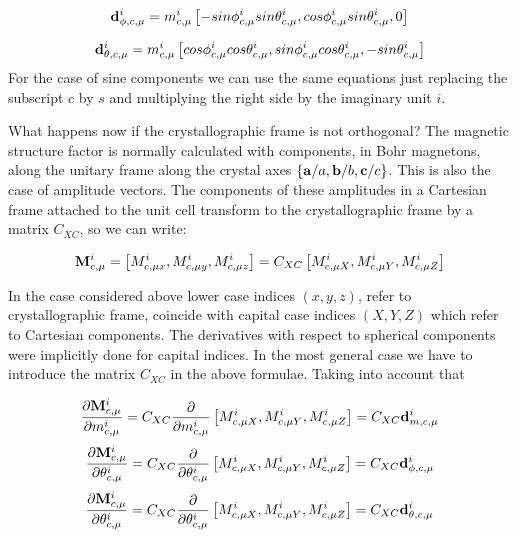 \documentclass[10pt]{article}
\begin{document}
\begin{equation} 
{\bf d}_{\phi,c,\mu}^i = m_{c,\mu}^i   \left[ -sin\phi_{c,\mu}^i sin\theta_{c,\mu}^i , cos\phi_{c,\mu}^i sin\theta_{c,\mu}^i , 0  \right] 
\end{equation}

\begin{equation} 
{\bf d}_{\theta,c,\mu}^i =  m_{c,\mu}^i   \left[ cos\phi_{c,\mu}^i cos\theta_{c,\mu}^i , sin\phi_{c,\mu}^i cos\theta_{c,\mu}^i , -sin\theta_{c,\mu}^i  \right]
\end{equation}
For the case of sine components we can use the same equations just replacing the subscript $c$ by $s$ and multiplying the right side by the imaginary unit $i$.

What happens now if the crystallographic frame is not orthogonal? The magnetic structure factor is normally calculated with components, in Bohr magnetons, along the unitary frame along the crystal axes $\{{\bf a}/a, {\bf b}/b, {\bf c}/c \}$. This is also the case of amplitude vectors. The components of these amplitudes in a Cartesian frame attached to the unit cell transform to the crystallographic frame by a matrix $C_{XC}$, so we can write:

\begin{equation} \label{car_to_cryst}
{\bf M}_{c,\mu}^{i} = \left[M_{c,\mu x}^{i},M_{c,\mu y}^{i},M_{c,\mu z}^{i}  \right] = C_{XC} \left[M_{c,\mu X}^{i},M_{c,\mu Y}^{i},M_{c,\mu Z}^{i}  \right]
\end{equation}

In the case considered above lower case indices $(x,y,z)$, refer to crystallographic frame, coincide with capital case indices $(X,Y,Z)$ which refer to Cartesian components. The derivatives with respect to spherical components were implicitly done for capital indices. In the most general case we have to introduce the matrix $C_{XC}$ in the above formulae. Taking into account that 

\begin{equation} \label{car_to_crystm}
\frac{\partial{\bf M}_{c,\mu}^{i}}{\partial m_{c,\mu}^i} =  C_{XC} \frac{\partial}{\partial m_{c,\mu}^i}\left[M_{c,\mu X}^{i},M_{c,\mu Y}^{i},M_{c,\mu Z}^{i}  \right]= C_{XC} {\bf d}_{m,c,\mu}^i
\end{equation}
\begin{equation} \label{car_to_crystphi}
\frac{\partial{\bf M}_{c,\mu}^{i}}{\partial \theta_{c,\mu}^i} =  C_{XC} \frac{\partial}{\partial \theta_{c,\mu}^i}\left[M_{c,\mu X}^{i},M_{c,\mu Y}^{i},M_{c,\mu Z}^{i}  \right] = C_{XC} {\bf d}_{\phi,c,\mu}^i
\end{equation}
\begin{equation} \label{car_to_crysttheta}
\frac{\partial{\bf M}_{c,\mu}^{i}}{\partial \theta_{c,\mu}^i} =  C_{XC} \frac{\partial}{\partial \theta_{c,\mu}^i}\left[M_{c,\mu X}^{i},M_{c,\mu Y}^{i},M_{c,\mu Z}^{i}  \right] =C_{XC} {\bf d}_{\theta,c,\mu}^i
\end{equation}
\end{document}
